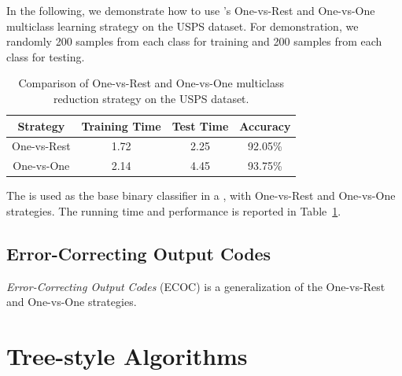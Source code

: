 In the following, we demonstrate how to use \shogun{}'s One-vs-Rest and 
One-vs-One multiclass learning strategy on the USPS dataset.  For 
demonstration, we randomly 200 samples from each class for training and 200 
samples from each class for testing.

\begin{table}\centering
	\begin{tabular}{cccc}
	\toprule
	Strategy & Training Time & Test Time & Accuracy \\
	\midrule
	One-vs-Rest & 1.72       & 2.25      & 92.05\%  \\
	One-vs-One  & 2.14       & 4.45      & 93.75\%  \\
	\bottomrule
	\end{tabular}
	\caption{Comparison of One-vs-Rest and One-vs-One multiclass reduction
		strategy on the USPS dataset.}
	\label{tab:ovr-vs-ovo}
\end{table}

The  is used as the base binary classifier in a
, with One-vs-Rest and One-vs-One
strategies. The running time and performance is reported in
Table~\ref{tab:ovr-vs-ovo}.

\subsection{Error-Correcting Output Codes}

\emph{Error-Correcting Output Codes} (ECOC) \citep{ECOC95,ECOCUnify} is a
generalization of the One-vs-Rest and One-vs-One strategies.

\section{Tree-style Algorithms}
\label{sec:multiclass-tree}
